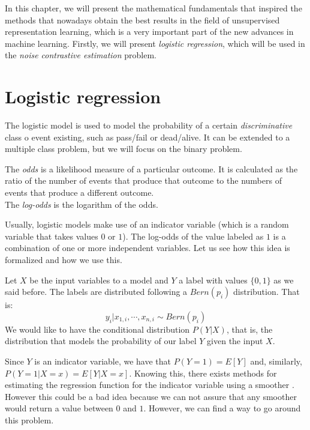 

\label{Chapter:NCE}

In this chapter, we will present the mathematical fundamentals that inspired the methods that nowadays obtain the best results in the field of unsupervised representation learning, which is a very important part of the new advances in machine learning. Firstly, we will present \emph{logistic regression}, which will be used in the \emph{noise contrastive estimation} problem.

\section{Logistic regression}

The logistic model is used to model the probability of a certain \emph{discriminative} class o event existing, such as pass/fail or dead/alive. It can be extended to a multiple class problem, but we will focus on the binary problem.

\begin{ndef}
The \emph{odds} is a likelihood measure of a particular outcome. It is calculated as the ratio of the number of events that produce that outcome to the numbers of events that produce a different outcome.\\

The \emph{log-odds} is the logarithm of the odds.
\end{ndef}

Usually, logistic models make use of an indicator variable (which is a random variable that takes values $0$ or $1$). The log-odds of the value labeled as $1$ is a combination of one or more independent variables. Let us see how this idea is formalized and how we use this.

Let $X$ be the input variables to a model and $Y$ a label with values $\{0,1\}$ as we said before. The labels are distributed following a $Bern(p_i)$ distribution. That is:
\[
y_i | x_{1,i},\cdots,x_{n,i} \sim Bern(p_i)    
\]
We would like to have the conditional distribution $P(Y|X)$, that is, the distribution that models the probability of our label $Y$ given the input $X$. 


Since $Y$ is an indicator variable, we have that $P(Y=1) = E[Y]$ and, similarly, $P(Y = 1 | X = x) = E[Y | X = x]$. Knowing this,  there exists methods for estimating the regression function for the indicator variable using a smoother \citep{cosma_advanced}. However this could be a bad idea because we can not assure that any smoother would return a value between $0$ and $1$. However, we can find a way to go around this problem.

